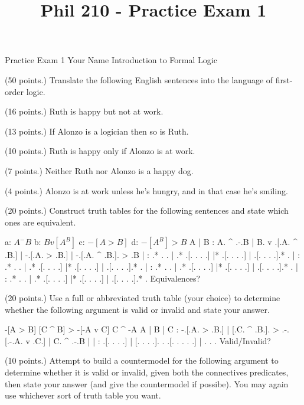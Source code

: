 
\title{Phil 210 - Practice Exam 1}

\heading
Practice Exam 1
Your Name
Introduction to Formal Logic
\endheading

(50 points.) Translate the following English sentences into the language of first-order logic.

\problems
{} (16 points.)
Ruth is happy but not at work.
	\answer
	$ $
	\endanswer

 (13 points.)
If Alonzo is a logician then so is Ruth.
	\answer
	$ $
	\endanswer

 (10 points.)
Ruth is happy only if Alonzo is at work.
	\answer
	$ $
	\endanswer

 (7 points.)
Neither Ruth nor Alonzo is a happy dog.
	\answer
	$ $
	\endanswer

 (4 points.)
Alonzo is at work unless he's hungry, and in that case he's smiling.
	\answer
	$ $
	\endanswer

\endproblems

(20 points.) Construct truth tables for the following sentences and state which ones are equivalent.

\problems
{}
\list
a: $ A ^ -B $
b: $ B v [A ^ B] $
c: $ -[A > B] $
d: $ -[A ^ B] > B $
\endlist
	\answer
	\truthtable
	 A | B : A. ^ .-.B | B. v .[.A. ^ .B.] | -.[.A. > .B.] | -.[.A. ^ .B.]. > .B
	\truthtableline
	   |   :  .*  . .  |  .*  .[. .   . .] |* .[. .   . .] |  .[. .   . .].*  . 
	   |   :  .*  . .  |  .*  .[. .   . .] |* .[. .   . .] |  .[. .   . .].*  . 
	   |   :  .*  . .  |  .*  .[. .   . .] |* .[. .   . .] |  .[. .   . .].*  . 
	   |   :  .*  . .  |  .*  .[. .   . .] |* .[. .   . .] |  .[. .   . .].*  . 
	\endtruthtable
	Equivalences?
	\endanswer

\endproblems

(20 points.) Use a full or abbreviated truth table (your choice) to determine whether the following argument is valid or invalid and state your answer.

\problems
{}
\argument
 -[A > B]
 [C ^ B] > -[-A v C]
\argumentline
 C ^ -A
\endargument
	\answer
	\truthtable
	 A | B | C : -.[.A. > .B.] | [.C. ^ .B.]. > .-.[.-.A. v .C.] | C. ^ .-.B
	\truthtableline
	   |   |   :  .[. .   . .] | [. .   . .].   . .[. . .   . .] |  .   . . 
	\endtruthtable
	Valid/Invalid?
	\endanswer

\endproblems

(10 points.) Attempt to build a countermodel for the following argument to determine whether it is valid or invalid, given both the connectives predicates, then state your answer (and give the countermodel if possibe). You may again use whichever sort of truth table you want.

